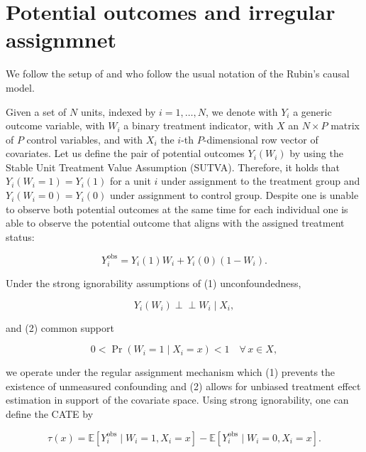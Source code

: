 \chapter{Potential outcomes and irregular assignmnet}

We follow the setup of \cite{bargagli_stoffi_causal_2020} and \cite{bargagli-stoffi_heterogeneous_2022} who follow the usual notation of the Rubin's causal model. 

Given a set of $N$ units, indexed by $i = 1, \ldots, N$, we denote with $Y_i$ a generic outcome variable, with $W_i$ a binary treatment indicator, with $X$ an $N \times P$ matrix of $P$ control variables, and with $X_i$ the $i$-th $P$-dimensional row vector of covariates.
Let us define the pair of potential outcomes $Y_i(W_i)$ by using the Stable Unit Treatment Value Assumption (SUTVA). Therefore, it holds that $Y_i(W_i = 1) = Y_i(1)$ for a unit $i$ under assignment to the treatment group and $Y_i(W_i = 0) = Y_i(0)$ under assignment to control group.
Despite one is unable to observe both potential outcomes at the same time for each individual one is able to observe the potential outcome that aligns with the assigned treatment status:

\[
Y_i^{\text{obs}} = Y_i(1)W_i + Y_i(0)(1 - W_i).
\]

Under the strong ignorability assumptions of (1) unconfoundedness, 

\[
Y_i(W_i) \perp\!\!\!\perp W_i \mid X_i, 
\tag{1}
\]

and (2) common support

\[
0 < \Pr(W_i = 1 \mid X_i = x) < 1 \quad \forall \, x \in X,
\tag{2}
\]

we operate under the regular assignment mechanism which (1) prevents the existence of unmeasured confounding and (2) allows for unbiased treatment effect estimation in support of the covariate space. 
Using strong ignorability, one can define the CATE by

\[
\tau(x) = \mathbb{E}[Y_i^{\text{obs}} \mid W_i = 1, X_i = x] - \mathbb{E}[Y_i^{\text{obs}} \mid W_i = 0, X_i = x].
\tag{4}
\]

